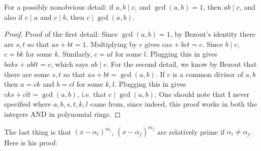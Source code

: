 \documentclass[12pt]{article}
\theoremstyle{definitionstyle}
\begin{document}
 For a possibly nonobvious detail: if $a, b \mid c$, and $\gcd(a, b) = 1$, then $ab \mid c$, and also if $c \mid a$ and $c \mid b$, then $c \mid \gcd(a, b)$. 
 \begin{proof}
 	Proof of the first detail: Since $\gcd(a, b) = 1$, by Bezout's identity there are $s, t$ so that $as + bt = 1$. Multiplying by $c$ gives $cas + bct = c$. Since $b \mid c$, $c = bk$ for some $k$. Similarly, $c = al$ for some $l$. Plugging this in gives $baks + ablt = c$, which says $ab \mid c$. For the second detail, we know by Bezout that there are some $s, t$ so that $as + bt = \gcd(a, b)$. If $c$ is a common divisor of $a, b$ then $a = ck$ and $b = cl$ for some $k, l$. Plugging this in gives $cks + clt = \gcd(a, b)$, i.e. that $c \mid \gcd(a,b)$. One should note that I never specified where $a, b, s, t, k, l$ came from, since indeed, this proof works in both the integers AND in polynomial rings.
 \end{proof}
 
 The last thing is that $(x-\alpha_i)^{m_i}$, $(x-\alpha_j)^{m_j}$ are relatively prime if $\alpha_i \neq \alpha_j$. Here is his proof:
 
\end{document}
